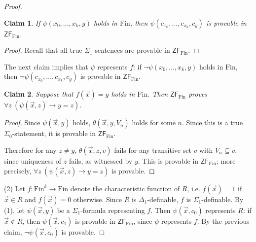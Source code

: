 \documentclass[a4paper, 11pt]{amsart}
\newtheorem*{claim*}{Claim}
\theoremstyle{remark}
\newcommand{\axiomft}[1]{\mathsf{#1}}
\newcommand{\ZF}{\axiomft{ZF}}
\newcommand{\Fin}{\mathrm{Fin}}
\begin{document}
\begin{proof}
\begin{claim*} 
If $\psi(x_0,\dots,x_k,y)$ holds in $\Fin$, then $\psi(c_{x_0},\dots,c_{x_k},c_y)$ is provable in $\ZF_\Fin$. 
\end{claim*} 
\begin{proof} 
Recall that all true $\Sigma_1$-sentences are provable in $\ZF_\Fin$. 
\end{proof} 

The next claim implies that $\psi$ represents $f$: if $\neg\psi(x_0,\dots,x_k,y)$ holds in $\Fin$, then $\neg\psi(c_{x_0},\dots,c_{x_k},c_y)$ is provable in $\ZF_\Fin$. 

\begin{claim*} 
Suppose that $f(\vec{x})=y$ holds in $\Fin$.
Then $\ZF_\Fin$ proves $\forall z\ ( \psi(\vec{x},z) \rightarrow y=z)$. 
\end{claim*} 
\begin{proof} 
Since $\psi(\vec{x},y)$ holds, $\theta(\vec{x},y,V_n)$ holds for some $n$. 
Since this is a true $\Sigma_0$-statement, it is provable in $\ZF_\Fin$. 

Therefore for any $z\neq y$, $\theta(\vec{x},z,v)$ fails for any transitive set $v$ with $V_n\subseteq v$, since uniqueness of $z$ fails, as witnessed by $y$. 
This is provable in $\ZF_\Fin$; more precisely, $\forall z\ ( \psi(\vec{x},z) \rightarrow y=z)$ is provable. 
\end{proof} 

(2) 
Let $f\colon \Fin^k \rightarrow \Fin$ denote the characteristic function of $R$, i.e. $f(\vec{x})=1$ if $\vec{x}\in R$ and $f(\vec{x})=0$ otherwise. 
Since $R$ is $\Delta_1$-definable, $f$ is $\Sigma_1$-definable.  
By (1), let $\psi(\vec{x},y)$ be a $\Sigma_1$-formula representing $f$. 
Then $\psi(\vec{x},c_0)$ represents $R$: 
if $\vec{x}\notin R$, then $\psi(\vec{x},c_1)$ is provable in $\ZF_\Fin$, since $\psi$ represents $f$. 
By the previous claim, $\neg\psi(\vec{x},c_0)$ is provable. 
\end{proof} 
\end{document}
